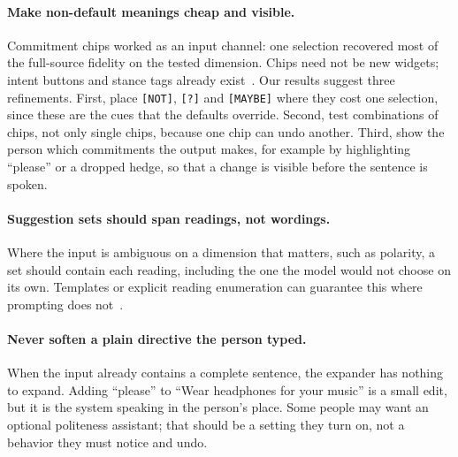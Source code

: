 \documentclass{ceurart}
\newcommand{\chip}[1]{\texttt{[#1]}}
\newcommand{\say}[1]{``#1''}
\begin{document}
\paragraph{Make non-default meanings cheap and visible.}
Commitment chips worked as an input channel: one selection recovered most of the full-source fidelity on the tested dimension. %
Chips need not be new widgets; intent buttons and stance tags already exist~\cite{valencia2024compa,mao2025designprobes,xiang2025socializechat}.
Our results suggest three refinements.
First, place \chip{NOT}, \chip{?} and \chip{MAYBE} where they cost one selection, since these are the cues that the defaults override. %
Second, test combinations of chips, not only single chips, because one chip can undo another. %
Third, show the person which commitments the output makes, for example by highlighting \say{please} or a dropped hedge, so that a change is visible before the sentence is spoken.

\paragraph{Suggestion sets should span readings, not wordings.}
Where the input is ambiguous on a dimension that matters, such as polarity, a set should contain each reading, including the one the model would not choose on its own.
Templates or explicit reading enumeration can guarantee this where prompting does not~\cite{saparina2026reasoningintent}. %

\paragraph{Never soften a plain directive the person typed.}
When the input already contains a complete sentence, the expander has nothing to expand.
Adding \say{please} to \say{Wear headphones for your music} is a small edit, but it is the system speaking in the person's place.
Some people may want an optional politeness assistant; that should be a setting they turn on, not a behavior they must notice and undo.
\end{document}

